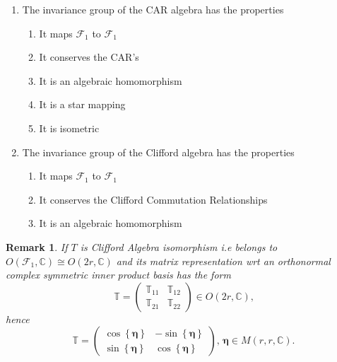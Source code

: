 \documentclass[aps, preprint]{revtex4}
\newtheorem{remark}[theorem]{Remark}
\begin{document}
\begin{enumerate}
\item The invariance group of the CAR algebra has the properties 


\begin{enumerate}
\item It maps $\mathcal{F}_{1}$ to $\mathcal{F}_{1}$ 

\item It conserves the CAR's 

\item It
is an algebraic homomorphism 

\item It is a star mapping 

\item It
is isometric \end{enumerate}


\item The invariance group of the Clifford
algebra has the properties 


\begin{enumerate}
\item It maps $\mathcal{F}_{1}$ to $\mathcal{F}_{1}$ 

\item It conserves the Clifford Commutation Relationships 

\item It
is an algebraic homomorphism \end{enumerate}
\end{enumerate}



\begin{remark}
If $T$ is Clifford Algebra isomorphism i.e belongs to $O \left (\mathcal{F}_{1} ,\mathbb{C}\right ) \cong O \left (2 r ,\mathbb{C}\right )$ and its matrix representation wrt an orthonormal complex symmetric inner product basis has the form
\begin{equation}\mathbb{T} =\left (\begin{array}{cc}\mathbb{T}_{1 1} & \mathbb{T}_{1 2} \\
\mathbb{T}_{2 1} & \mathbb{T}_{2 2}\end{array}\right ) \in O \left (2 r ,\mathbb{C}\right )\text{,}
\end{equation}hence
\begin{equation}\mathbb{T} =\left (\begin{array}{cc}\cos  \left \{\mathbf{\eta }\right \} &  -\sin  \left \{\mathbf{\eta }\right \} \\
\sin  \left \{\mathbf{\eta }\right \} & \cos  \left \{\mathbf{\eta }\right \}\end{array}\right ) ,\,\mathbf{\eta } \in M \left (r ,r ,\mathbb{C}\right )\text{.}
\end{equation}
\end{remark}
\end{document}
